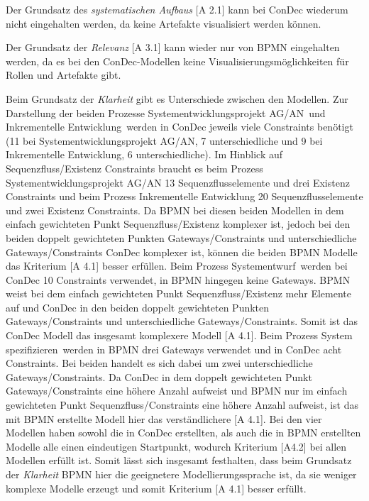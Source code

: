 { 
Der  Grundsatz des \textit{systematischen Aufbaus} [A 2.1] kann bei ConDec wiederum nicht eingehalten werden, da keine Artefakte visualisiert werden können.\newline

Der Grundsatz der \textit{Relevanz} [A 3.1] kann wieder nur von BPMN eingehalten werden, da es bei den ConDec-Modellen keine Visualisierungsmöglichkeiten für Rollen und Artefakte gibt.\newline


Beim Grundsatz der \textit{Klarheit} gibt es Unterschiede zwischen den Modellen. Zur Darstellung der beiden Prozesse \grqq Systementwicklungsprojekt AG/AN\grqq \ und \grqq Inkrementelle Entwicklung\grqq \ werden in ConDec jeweils viele Constraints benötigt (11 bei Systementwicklungsprojekt AG/AN, 7 unterschiedliche und 9 bei Inkrementelle Entwicklung, 6 unterschiedliche). Im Hinblick auf Sequenzfluss/Existenz Constraints braucht es beim Prozess Systementwicklungsprojekt AG/AN 13 Sequenzflusselemente und drei Existenz Constraints und beim Prozess Inkrementelle Entwicklung 20 Sequenzflusselemente und zwei Existenz Constraints. Da BPMN bei diesen beiden Modellen in dem einfach gewichteten Punkt Sequenzfluss/Existenz komplexer ist, jedoch bei den beiden doppelt gewichteten Punkten Gateways/Constraints und unterschiedliche Gateways/Constraints ConDec komplexer ist, können die beiden BPMN Modelle das Kriterium [A 4.1] besser erfüllen.\newline
Beim Prozess \grqq Systementwurf\grqq \ werden bei ConDec 10 Constraints verwendet, in BPMN hingegen keine Gateways. BPMN weist bei dem einfach gewichteten Punkt Sequenzfluss/Existenz mehr Elemente auf und ConDec in den beiden doppelt gewichteten Punkten Gateways/Constraints und unterschiedliche Gateways/Constraints. Somit ist das ConDec Modell das insgesamt komplexere Modell [A 4.1].\newline
Beim Prozess \grqq System spezifizieren\grqq \ werden in BPMN drei Gateways verwendet und in ConDec acht Constraints. Bei beiden handelt es sich dabei um zwei unterschiedliche Gateways/Constraints. Da ConDec in dem doppelt gewichteten Punkt Gateways/Constraints eine höhere Anzahl aufweist und BPMN nur im einfach gewichteten Punkt Sequenzfluss/Constraints eine höhere Anzahl aufweist, ist das mit BPMN erstellte Modell hier das verständlichere [A 4.1]. \newline
Bei den vier Modellen haben sowohl die in ConDec erstellten, als auch die in BPMN erstellten Modelle alle einen eindeutigen Startpunkt, wodurch Kriterium [A4.2] bei allen Modellen erfüllt ist.\newline
Somit lässt sich insgesamt festhalten, dass beim Grundsatz der \textit{Klarheit} BPMN hier die geeignetere Modellierungssprache ist, da sie weniger komplexe Modelle erzeugt und somit Kriterium [A 4.1] besser erfüllt.\newline

}
